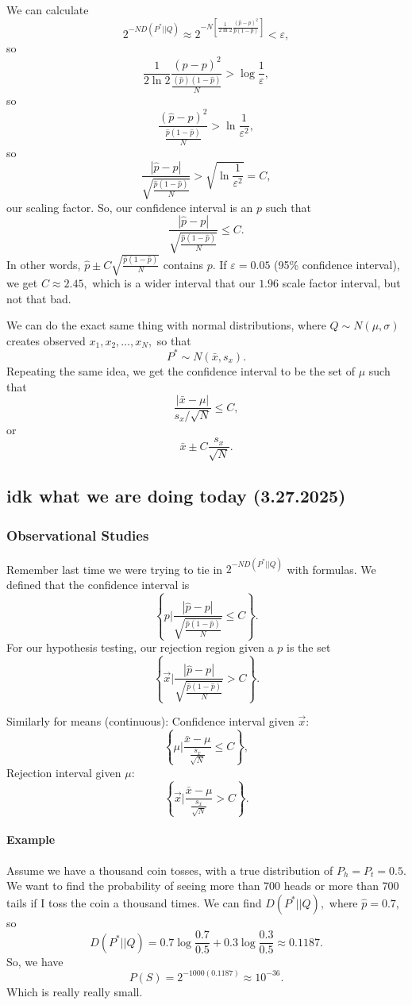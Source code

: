 \documentclass[12pt]{article}
\theoremstyle{remark}
\begin{document}
We can calculate
\[2^{-N D(P^\ast||Q)}\approx 2^{-N\left[\frac{1}{2\ln 2}\frac{(\hat p-p)^2}{\hat p(1-\hat p)}\right]}<\varepsilon,\] so
\[\frac{1}{2\ln 2}\frac{(\hat p-p)^2}{\frac{(\hat p)(1-\hat p)}{N}}>\log\frac{1}{\varepsilon},\] so
\[\frac{(\hat p-p)^2}{\frac{\hat p(1-\hat p)}{N}}>\ln\frac{1}{\varepsilon^2},\]
so
\[\frac{|\hat p-p|}{\sqrt{\frac{\hat p(1-\hat p)}{N}}}>\sqrt{\ln\frac{1}{\varepsilon^2}}=C,\] our scaling factor. So, our confidence interval is an $p$ such that
\[\frac{|\hat p-p|}{\sqrt{\frac{\hat p(1-\hat p)}{N}}}\le C.\] In other words, $\hat p\pm C\sqrt{\frac{\hat p(1-\hat p)}{N}}$ contains $p.$ If $\varepsilon=0.05$ (95\% confidence interval), we get $C\approx 2.45,$ which is a wider interval that our $1.96$ scale factor interval, but not that bad.

We can do the exact same thing with normal distributions, where $Q\sim N(\mu,\sigma)$ creates observed $x_1,x_2,\dots,x_N,$ so that
\[P^\ast\sim N(\bar{x},s_x).\] Repeating the same idea, we get the confidence interval to be the set of $\mu$ such that
\[\frac{|\bar{x}-\mu|}{s_x/\sqrt{N}}\le C,\] or \[\bar{x}\pm C\frac{s_x}{\sqrt{N}}.\]

\subsection{idk what we are doing today (3.27.2025)}
\subsubsection{Observational Studies}
Remember last time we were trying to tie in $2^{-ND(P^\ast||Q)}$ with formulas. We defined that the confidence interval is
\[\left\{p\Bigg\vert\frac{|\hat p-p|}{\sqrt{\frac{\hat p(1-\hat p)}{N}}}\le C\right\}.\]
For our hypothesis testing, our rejection region given a $p$ is the set
\[\left\{\vec{x}\Bigg\vert\frac{|\hat p-p|}{\sqrt{\frac{\hat p(1-\hat p)}{N}}}>C\right\}.\]


Similarly for means (continuous):
Confidence interval given $\vec{x}$:
\[\left\{\mu\Bigg\vert\frac{\bar{x}-\mu}{\frac{s_x}{\sqrt{N}}}\le C\right\},\]
Rejection interval given $\mu$:
\[\left\{\vec{x}\Bigg\vert\frac{\bar{x}-\mu}{\frac{s_x}{\sqrt{N}}}>C\right\}.\]

\paragraph{Example}
Assume we have a thousand coin tosses, with a true distribution of $P_h=P_t=0.5.$ We want to find the probability of seeing more than 700 heads or more than 700 tails if I toss the coin a thousand times. We can find $D(P^\ast||Q),$ where $\hat{p}=0.7,$ so
\[D(P^\ast||Q)=0.7\log\frac{0.7}{0.5}+0.3\log\frac{0.3}{0.5}\approx 0.1187.\]
So, we have
\[P(S)=2^{-1000(0.1187)}\approx 10^{-36}.\] Which is really really small.
\end{document}
